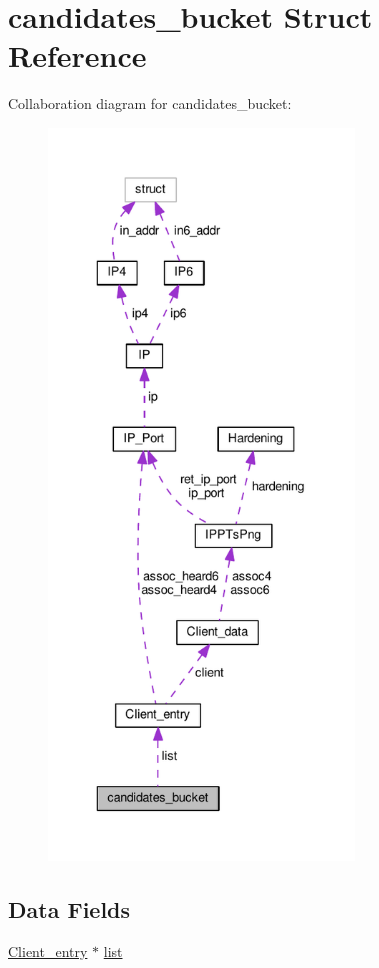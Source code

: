 \hypertarget{structcandidates__bucket}{\section{candidates\+\_\+bucket Struct Reference}
\label{structcandidates__bucket}
}


Collaboration diagram for candidates\+\_\+bucket\+:
\nopagebreak
\begin{figure}[H]
\begin{center}
\leavevmode
\includegraphics[height=550pt]{d1/d10/structcandidates__bucket__coll__graph}
\end{center}
\end{figure}
\subsection*{Data Fields}
\begin{DoxyCompactItemize}
\item 
\hyperlink{struct_client__entry}{Client\+\_\+entry} $\ast$ \hyperlink{structcandidates__bucket_a515f2b5e53003e623b334ab90c4280e0}{list}
\end{DoxyCompactItemize}


